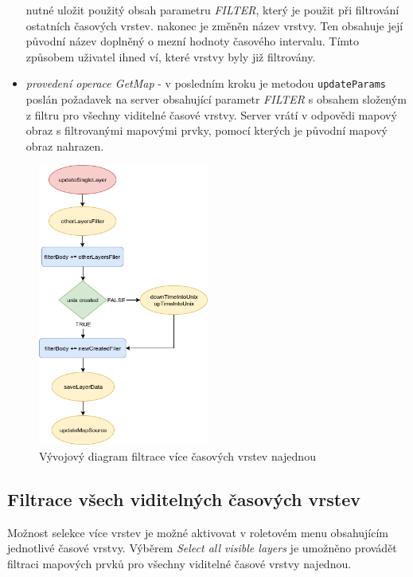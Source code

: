 \begin{itemize}
nutné uložit použitý obsah parametru \textit{FILTER}, který
je použit při filtrování ostatních časových vrstev. nakonec
je změněn název vrstvy. Ten obsahuje její původní název doplněný o
mezní hodnoty časového intervalu. Tímto způsobem uživatel ihned
ví, které vrstvy byly již filtrovány.
\item\textit{provedení operace GetMap} - v posledním kroku je
metodou \verb|updateParams| poslán požadavek na server obsahující
parametr \textit{FILTER} s obsahem složeným z filtru pro všechny
viditelné časové vrstvy. Server vrátí v odpovědi mapový obraz s
filtrovanými mapovými prvky, pomocí kterých je původní mapový
obraz nahrazen.
\end{itemize}

\begin{figure}[h!]
\centering
\includegraphics[width=0.5\textwidth]{../img/getSingleLayer.png}
\caption{Vývojový diagram filtrace více časových vrstev najednou
	\cite{flow-chart}}
\label{fig:single-chart}
\end{figure}

\subsection{Filtrace všech viditelných časových vrstev}
\label{sssec:multiple-layers-filtration}

Možnost selekce více vrstev je možné aktivovat v roletovém menu
obsahujícím jednotlivé časové vrstvy. Výběrem \textit{Select all
visible layers} je umožněno provádět filtraci mapových prvků pro
všechny viditelné časové vrstvy najednou.

